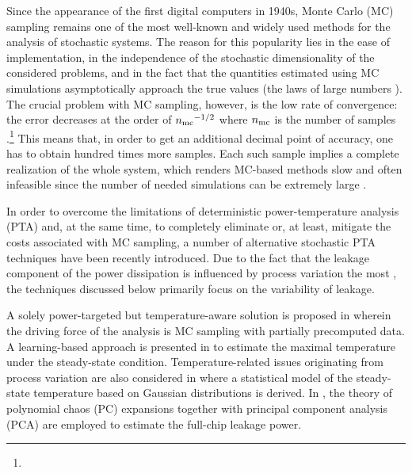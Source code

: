 Since the appearance of the first digital computers in 1940s, Monte Carlo (MC) sampling remains one of the most well-known and widely used methods for the analysis of stochastic systems.
The reason for this popularity lies in the ease of implementation, in the independence of the stochastic dimensionality of the considered problems, and in the fact that the quantities estimated using MC simulations asymptotically approach the true values (the laws of large numbers \cite{durrett2010}).
The crucial problem with MC sampling, however, is the low rate of convergence: the error decreases at the order of ${n_\text{mc}}^{-1/2}$ where ${n_\text{mc}}$ is the number of samples \cite{xiu2010, maitre2010}.\footnote{}
This means that, in order to get an additional decimal point of accuracy, one has to obtain hundred times more samples.
Each such sample implies a complete realization of the whole system, which renders MC-based methods slow and often infeasible since the number of needed simulations can be extremely large \cite{diaz-emparanza2002}.

In order to overcome the limitations of deterministic power-temperature analysis (PTA) and, at the same time, to completely eliminate or, at least, mitigate the costs associated with MC sampling, a number of alternative stochastic PTA techniques have been recently introduced.
Due to the fact that the leakage component of the power dissipation is influenced by process variation the most \cite{chandrakasan2001, srivastava2010, juan2011, juan2012}, the techniques discussed below primarily focus on the variability of leakage.

A solely power-targeted but temperature-aware solution is proposed in \cite{chandra2010} wherein the driving force of the analysis is MC sampling with partially precomputed data.
A learning-based approach is presented in \cite{juan2011} to estimate the maximal temperature under the steady-state condition.
Temperature-related issues originating from process variation are also considered in \cite{juan2012} where a statistical model of the steady-state temperature based on Gaussian distributions is derived.
In \cite{shen2009}, the theory of polynomial chaos (PC) expansions \cite{xiu2010, maitre2010, ghanem1991} together with principal component analysis (PCA) are employed to estimate the full-chip leakage power.

